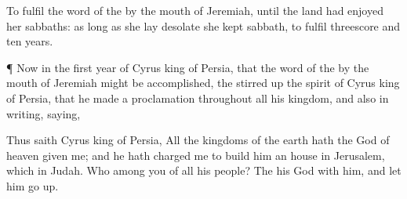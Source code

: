 {To
fulfil the
word of the
{} by the
mouth of
Jeremiah, until the
land had
enjoyed her
sabbaths:
{} as long
as she lay
desolate she kept
sabbath, to
fulfil threescore and
ten
years.


\par }{\PP {}¶ Now in the
first
year of
Cyrus
king of
Persia, that the
word of the
{}
{} by the
mouth of
Jeremiah might be
accomplished, the
{} stirred
up the
spirit of
Cyrus
king of
Persia, that he made a
proclamation throughout all his
kingdom, and
{} also in
writing,
saying,

Thus
saith
Cyrus
king of
Persia, All the
kingdoms of the
earth hath the
{}
God of
heaven
given me; and he hath
charged me to
build him an
house in
Jerusalem, which
{} in
Judah. Who
{} among you of all his
people? The
{} his
God
{} with him, and let him go
up.


\par }